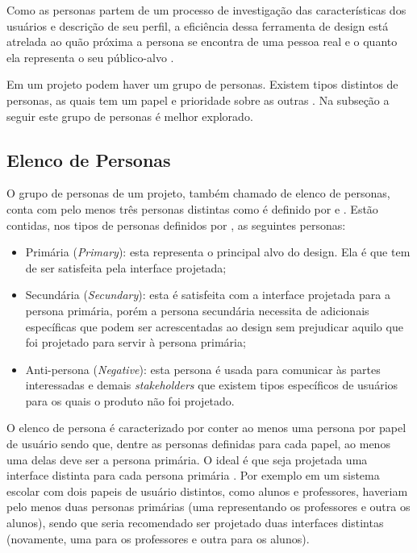 Como as personas partem de um processo de investigação das características dos usuários e descrição de seu perfil, a eficiência dessa ferramenta de design está atrelada ao quão próxima a persona se encontra de uma pessoa real e o quanto ela representa o seu público-alvo \cite[p. 154]{BarbosaEtAl2021}. 

Em um projeto podem haver um grupo de personas. Existem tipos distintos de personas, as quais tem um papel e prioridade sobre as outras \cite[p. 154]{BarbosaEtAl2021}. Na subseção a seguir este grupo de personas é melhor explorado.

\subsection{Elenco de Personas}

O grupo de personas de um projeto, também chamado de elenco de personas, conta com pelo menos três personas distintas como é definido por  e \citeauthor{usability2020}. Estão contidas, nos tipos de personas definidos por , as seguintes personas:

\begin{itemize}
    \item Primária (\textit{Primary}): esta representa o principal alvo do design. Ela é que tem de ser satisfeita pela interface projetada;
    
    \item Secundária (\textit{Secundary}): esta é satisfeita com a interface projetada para a persona primária, porém a persona secundária necessita de adicionais específicas que podem ser acrescentadas ao design sem prejudicar aquilo que foi projetado para servir à persona primária;
    
    
    \item Anti-persona (\textit{Negative}): esta persona é usada para comunicar às partes interessadas e demais \textit{stakeholders} que existem tipos específicos de usuários para os quais o produto não foi projetado. 
\end{itemize}

O elenco de persona é caracterizado por conter ao menos uma persona por papel de usuário sendo que, dentre as personas definidas para cada papel, ao menos uma delas deve ser a persona primária. O ideal é que seja projetada uma interface distinta para cada persona primária \cite[p. 155]{BarbosaEtAl2021}. Por exemplo em um sistema escolar com dois papeis de usuário distintos, como alunos e professores, haveriam pelo menos duas personas primárias (uma representando os professores e outra os alunos), sendo que seria recomendado ser projetado duas interfaces distintas (novamente, uma para os professores e outra para os alunos).

